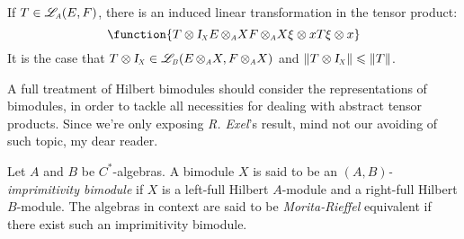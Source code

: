 If $T\in \sub\adj{A}(E,F)$, there is an induced linear transformation in the tensor product:
\begin{equation*}
	\function{{T\otimes \sub\Id X}{E\,\sub\otimes A X}{F\,\sub\otimes A X}{\xi\otimes x}{T\xi\otimes x}}
\end{equation*}
It is the case that $T\otimes \sub\Id X \in \sub\adj{B}(E\,\sub\otimes A X, F\,\sub\otimes A X)$ and $\|T\otimes \sub\Id X\| \leqslant \|T\|$.

A full treatment of Hilbert bimodules should consider the representations of bimodules, in order to tackle all necessities for dealing with abstract tensor products. Since we're only exposing \textit{R. Exel}'s result, mind not our avoiding of such topic, my dear reader.

\begin{definicao}
	Let $A$ and $B$ be $C^*$-algebras. A bimodule $X$ is said to be an \textit{$(A,B)$-imprimitivity bimodule} if $X$ is a left-full Hilbert $A$-module and a right-full Hilbert $B$-module. The algebras in context are said to be \textit{Morita-Rieffel} equivalent if there exist such an imprimitivity bimodule.
\end{definicao}

